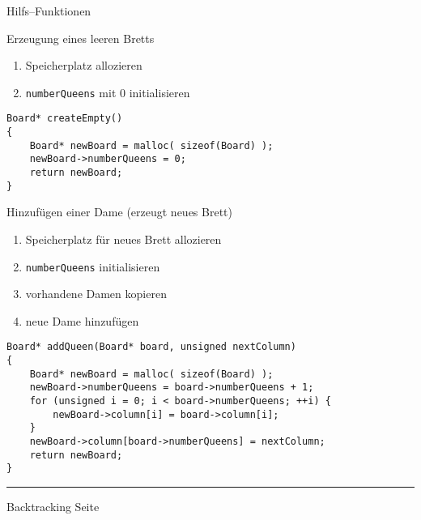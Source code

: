 \begin{slide}{}
\normalsize

\begin{center}
Hilfs--Funktionen
\end{center}
\vspace*{0.5cm}

\footnotesize

Erzeugung eines leeren Bretts
\begin{enumerate}
\item Speicherplatz allozieren
\item \texttt{numberQueens} mit 0 initialisieren
\end{enumerate}
\begin{verbatim}
Board* createEmpty()
{
    Board* newBoard = malloc( sizeof(Board) );
    newBoard->numberQueens = 0;
    return newBoard;
}
\end{verbatim}

Hinzuf\"ugen einer Dame (erzeugt neues Brett)
\begin{enumerate}
\item Speicherplatz f\"ur neues Brett allozieren
\item \texttt{numberQueens} initialisieren
\item vorhandene Damen kopieren
\item neue Dame hinzuf\"ugen
\end{enumerate}

\begin{verbatim}
Board* addQueen(Board* board, unsigned nextColumn)
{
    Board* newBoard = malloc( sizeof(Board) );
    newBoard->numberQueens = board->numberQueens + 1;
    for (unsigned i = 0; i < board->numberQueens; ++i) {
        newBoard->column[i] = board->column[i];
    }
    newBoard->column[board->numberQueens] = nextColumn;
    return newBoard;
}
\end{verbatim}

\vspace*{\fill}
\tiny \addtocounter{mypage}{1}
\rule{17cm}{1mm}
Backtracking  \hspace*{\fill} Seite 
\end{slide}


